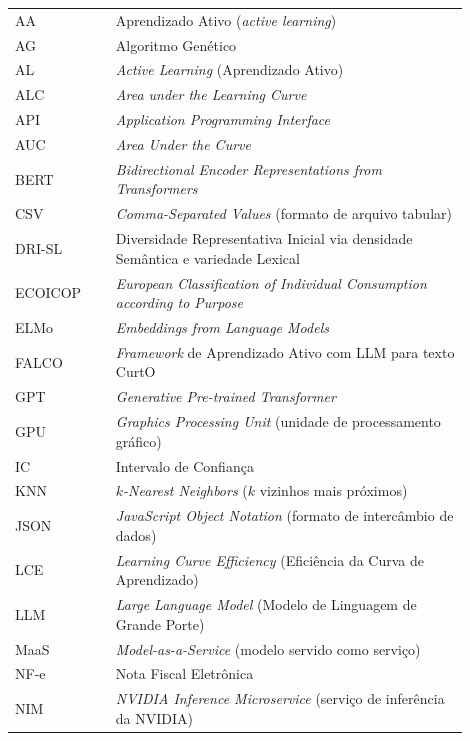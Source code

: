 

\begin{listaacron}

\begin{longtable}[l]{p{0.2\linewidth}p{0.7\linewidth}}
AA & Aprendizado Ativo (\textit{active learning})\\
AG & Algoritmo Genético\\
AL & \textit{Active Learning} (Aprendizado Ativo)\\
ALC & \textit{Area under the Learning Curve}\\
API & \textit{Application Programming Interface}\\
AUC & \textit{Area Under the Curve}\\
BERT & \textit{Bidirectional Encoder Representations from Transformers}\\
CSV & \textit{Comma-Separated Values} (formato de arquivo tabular)\\
DRI-SL & Diversidade Representativa Inicial via densidade Semântica e variedade Lexical\\
ECOICOP & \textit{European Classification of Individual Consumption according to Purpose}\\
ELMo & \textit{Embeddings from Language Models}\\
FALCO & \textit{Framework} de Aprendizado Ativo com LLM para texto CurtO\\
GPT & \textit{Generative Pre-trained Transformer}\\
GPU & \textit{Graphics Processing Unit} (unidade de processamento gráfico)\\
IC & Intervalo de Confiança\\
KNN & \textit{$k$-Nearest Neighbors} ($k$ vizinhos mais próximos)\\
JSON & \textit{JavaScript Object Notation} (formato de intercâmbio de dados)\\
LCE & \textit{Learning Curve Efficiency} (Eficiência da Curva de Aprendizado)\\
LLM & \textit{Large Language Model} (Modelo de Linguagem de Grande Porte)\\
MaaS & \textit{Model-as-a-Service} (modelo servido como serviço)\\
NF-e & Nota Fiscal Eletrônica\\
NIM & \textit{NVIDIA Inference Microservice} (serviço de inferência da NVIDIA)\\

\end{longtable}
\end{listaacron}
